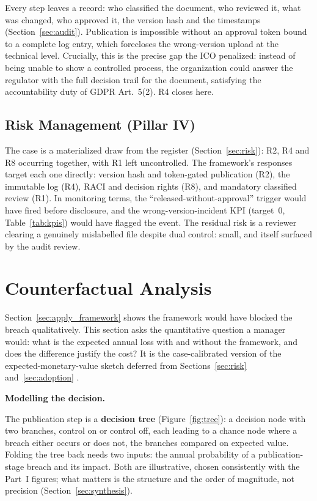 \documentclass[12pt,a4paper]{article}
\begin{document}
Every step leaves a record: who classified the document, who reviewed it, what was changed, who approved it, the version hash and the timestamps (Section~\ref{sec:audit}). Publication is impossible without an approval token bound to a complete log entry, which forecloses the wrong-version upload at the technical level. Crucially, this is the precise gap the ICO penalized: instead of being unable to show a controlled process, the organization could answer the regulator with the full decision trail for the document, satisfying the accountability duty of GDPR Art.~5(2). R4 closes here.

\subsection{Risk Management (Pillar IV)}

The case is a materialized draw from the register (Section~\ref{sec:risk}): R2, R4 and R8 occurring together, with R1 left uncontrolled. The framework's responses target each one directly: version hash and token-gated publication (R2), the immutable log (R4), RACI and decision rights (R8), and mandatory classified review (R1). In monitoring terms, the ``released-without-approval'' trigger would have fired before disclosure, and the wrong-version-incident KPI (target~$0$, Table~\ref{tab:kpis}) would have flagged the event. The residual risk is a reviewer clearing a genuinely mislabelled file despite dual control: small, and itself surfaced by the audit review.

\section{Counterfactual Analysis}
\label{sec:counterfactual}

Section~\ref{sec:apply_framework} shows the framework would have blocked the breach qualitatively. This section asks the quantitative question a manager would: what is the expected annual loss with and without the framework, and does the difference justify the cost? It is the case-calibrated version of the expected-monetary-value sketch deferred from Sections~\ref{sec:risk} and~\ref{sec:adoption} \cite{falchi_slides}.

\noindent\textbf{Modelling the decision.}\par
The publication step is a \textbf{decision tree} \cite{falchi_slides} (Figure~\ref{fig:tree}): a decision node with two branches, control on or control off, each leading to a chance node where a breach either occurs or does not, the branches compared on expected value. Folding the tree back needs two inputs: the annual probability of a publication-stage breach and its impact. Both are illustrative, chosen consistently with the Part~I figures; what matters is the structure and the order of magnitude, not precision (Section~\ref{sec:synthesis}).
\end{document}
